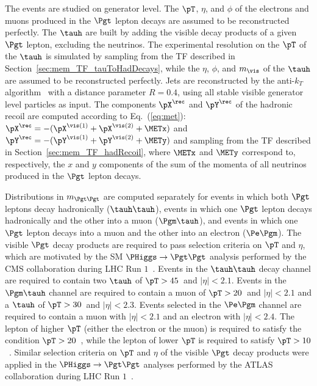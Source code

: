 The events are studied on generator level.
The $\pT$, $\eta$, and $\phi$ of the electrons and muons produced in the $\Pgt$ lepton decays
are assumed to be reconstructed perfectly.
The $\tauh$ are built by adding the visible decay products of a given $\Pgt$ lepton, excluding the neutrinos.
The experimental resolution on the $\pT$ of the $\tauh$ is simulated by sampling from the TF described in Section~\ref{sec:mem_TF_tauToHadDecays},
while the $\eta$, $\phi$, and $m_{\vis}$ of the $\tauh$ are assumed to be reconstructed perfectly.
Jets are reconstructed by the anti-$k_{T}$ algorithm~\cite{AntiKT} with a distance parameter $R = 0.4$,
using all stable visible generator level particles as input.
The components $\pX^{\rec}$ and $\pY^{\rec}$ of the hadronic recoil are computed according to Eq.~(\ref{eq:met}):
$\pX^{\rec} = -( \pX^{\vis(1)} + \pX^{\vis(2)} + \METx )$
and
$\pY^{\rec} = -( \pY^{\vis(1)} + \pY^{\vis(2)} + \METy )$
and sampling from the TF described in Section~\ref{sec:mem_TF_hadRecoil},
where $\METx$ and $\METy$ correspond to, respectively, the $x$ and $y$ components of the sum of the momenta of all neutrinos produced in the $\Pgt$ lepton decays.

Distributions in $m_{\Pgt\Pgt}$ are computed separately for events in which 
both $\Pgt$ leptons decay hadronically ($\tauh\tauh$), 
events in which one $\Pgt$ lepton decays hadronically and the other into a muon ($\Pgm\tauh$),
and events in which one $\Pgt$ lepton decays into a muon and the other into an electron ($\Pe\Pgm$).
The visible $\Pgt$ decay products are required to pass selection criteria on $\pT$ and $\eta$,
which are motivated by the SM $\PHiggs \to \Pgt\Pgt$ analysis performed by the CMS collaboration during LHC Run $1$~\cite{HIG-13-004}.
Events in the $\tauh\tauh$ decay channel are required to contain
two $\tauh$ of $\pT > 45$~\GeV and $\vert\eta\vert < 2.1$.
Events in the $\Pgm\tauh$ channel
are required to contain a muon of $\pT > 20$~\GeV and $\vert\eta\vert < 2.1$ and a $\tauh$ of $\pT > 30$~\GeV and $\vert\eta\vert < 2.3$.
Events selected in the $\Pe\Pgm$ channel are required to contain a muon with $\vert\eta\vert < 2.1$ and an electron with $\vert\eta\vert < 2.4$.
The lepton of higher $\pT$ (either the electron or the muon) is required to satisfy the condition $\pT > 20$~\GeV,
while the lepton of lower $\pT$ is required to satisfy $\pT > 10$~\GeV.
Similar selection criteria on $\pT$ and $\eta$ of the visible $\Pgt$ decay products were applied in the $\PHiggs \to \Pgt\Pgt$
analyses performed by the ATLAS
collaboration during LHC Run $1$~\cite{ATLAS_HiggsTauTau_SM,ATLAS_HiggsTauTau_MSSM}.

